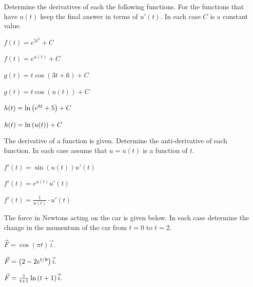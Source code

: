 
\begin{problem}
\item Determine the derivatives of each the following functions. For
  the functions that have $u(t)$ keep the final answer in terms of
  $u'(t)$. In each case $C$ is a constant value.
  \begin{subproblem}
    \item $f(t) = e^{5t^2} + C$
      \vfill
    \item $f(t) = e^{u(t)} + C$
      \vfill
    \item $g(t) = t \cos(3t+6)  + C$
      \vfill
    \item $g(t) = t \cos(u(t))  + C$
      \vfill
    \item $h(t) = \ln\left( e^{8t} + 5 \right)  + C$
      \vfill
    \item $h(t) = \ln\left( u(t) \right)  + C$
      \vfill
  \end{subproblem}

\end{problem}


\begin{problem}
  \clearpage

\item The derivative of a function is given. Determine the
  anti-derivative of each function. In each case assume that $u=u(t)$
  is a function of $t$. 
  \begin{subproblem}
  \item $f'(t) = \sin(u(t)) u'(t)$
    \vfill
  \item $f'(t) = e^{u(t)} u'(t)$
    \vfill
  \item $f'(t) = \frac{1}{u(t)} \cdot u'(t)$
    \vfill
  \end{subproblem}

  \clearpage

\item The force in Newtons acting on the car is given below. In each
  case determine the change in the momentum of the car from $t=0$ to
  $t=2$. 
  \begin{subproblem}
    \item $\vec{F} = \cos(\pi t) \vec{i}.$
      \vfill
    \item $\vec{F} = \left( 2 - 2 e^{t/9} \right) \vec{i}.$
      \vfill
    \item $\vec{F} = \frac{1}{t+1} \ln\left( t+1 \right) \vec{i}.$
      \vfill
  \end{subproblem}

\end{problem}

